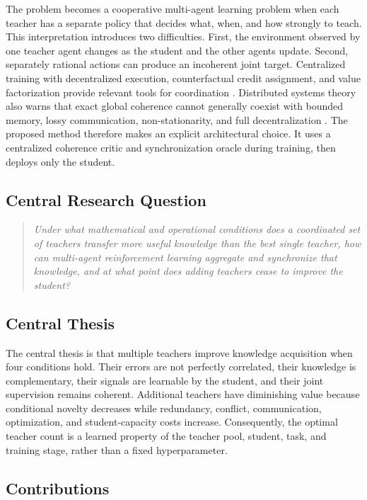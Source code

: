 \documentclass[10pt,twocolumn,a4paper]{article}
\begin{document}
The problem becomes a cooperative multi-agent learning problem when each teacher has a separate policy that decides what, when, and how strongly to teach. This interpretation introduces two difficulties. First, the environment observed by one teacher agent changes as the student and the other agents update. Second, separately rational actions can produce an incoherent joint target. Centralized training with decentralized execution, counterfactual credit assignment, and value factorization provide relevant tools for coordination \cite{lowe2017,foerster2018,rashid2018,yu2022}. Distributed systems theory also warns that exact global coherence cannot generally coexist with bounded memory, lossy communication, non-stationarity, and full decentralization \cite{halpern1990,chiurunge2026}. The proposed method therefore makes an explicit architectural choice. It uses a centralized coherence critic and synchronization oracle during training, then deploys only the student.

\subsection{Central Research Question}

\begin{quote}
\itshape Under what mathematical and operational conditions does a coordinated set of teachers transfer more useful knowledge than the best single teacher, how can multi-agent reinforcement learning aggregate and synchronize that knowledge, and at what point does adding teachers cease to improve the student?
\end{quote}

\subsection{Central Thesis}

The central thesis is that multiple teachers improve knowledge acquisition when four conditions hold. Their errors are not perfectly correlated, their knowledge is complementary, their signals are learnable by the student, and their joint supervision remains coherent. Additional teachers have diminishing value because conditional novelty decreases while redundancy, conflict, communication, optimization, and student-capacity costs increase. Consequently, the optimal teacher count is a learned property of the teacher pool, student, task, and training stage, rather than a fixed hyperparameter.

\subsection{Contributions}
\end{document}
